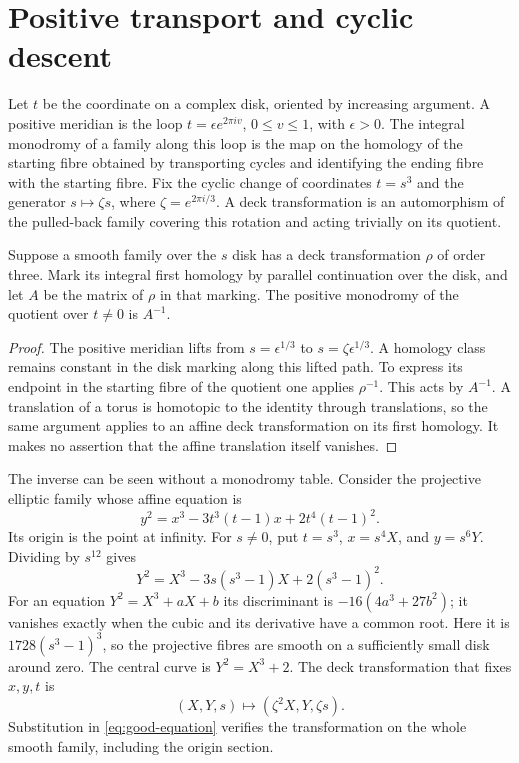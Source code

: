 \section{Positive transport and cyclic descent}

Let $t$ be the coordinate on a complex disk, oriented by increasing
argument. A positive meridian is the loop $t=\epsilon e^{2\pi iv}$,
$0\le v\le1$, with $\epsilon>0$. The integral monodromy of a family
along this loop is the map on the homology of the starting fibre
obtained by transporting cycles and identifying the ending fibre
with the starting fibre. Fix the cyclic change of coordinates $t=s^3$
and the generator $s\mapsto\zeta s$, where
$\zeta=e^{2\pi i/3}$. A deck transformation is an automorphism of
the pulled-back family covering this rotation and acting trivially
on its quotient.

\begin{lemma}\label{lem:inverse-descent}
Suppose a smooth family over the $s$ disk has a deck transformation
$\rho$ of order three. Mark its integral first homology by parallel
continuation over the disk, and let $A$ be the matrix of $\rho$ in
that marking. The positive monodromy of the quotient over $t\ne0$
is $A^{-1}$.
\end{lemma}
\begin{proof}
The positive meridian lifts from $s=\epsilon^{1/3}$ to
$s=\zeta\epsilon^{1/3}$. A homology class remains constant in the
disk marking along this lifted path. To express its endpoint in the
starting fibre of the quotient one applies $\rho^{-1}$. This acts
by $A^{-1}$. A translation of a torus is homotopic to the identity
through translations, so the same argument applies to an affine
deck transformation on its first homology. It makes no assertion
that the affine translation itself vanishes.
\end{proof}

The inverse can be seen without a monodromy table. Consider the
projective elliptic family whose affine equation is
\begin{equation}\label{eq:weierstrass}
 y^2=x^3-3t^3(t-1)x+2t^4(t-1)^2.
\end{equation}
Its origin is the point at infinity. For $s\ne0$, put
$t=s^3$, $x=s^4X$, and $y=s^6Y$. Dividing by $s^{12}$ gives
\begin{equation}\label{eq:good-equation}
 Y^2=X^3-3s(s^3-1)X+2(s^3-1)^2.
\end{equation}
For an equation $Y^2=X^3+aX+b$ its discriminant is
$-16(4a^3+27b^2)$; it vanishes exactly when the cubic and its
derivative have a common root. Here it is
$1728(s^3-1)^3$, so the projective fibres are smooth on a
sufficiently small disk around zero. The central curve is
$Y^2=X^3+2$. The deck transformation that fixes $x,y,t$ is
\begin{equation}\label{eq:actual-elliptic-deck}
 (X,Y,s)\longmapsto(\zeta^2X,Y,\zeta s).
\end{equation}
Substitution in \eqref{eq:good-equation} verifies the transformation
on the whole smooth family, including the origin section.

